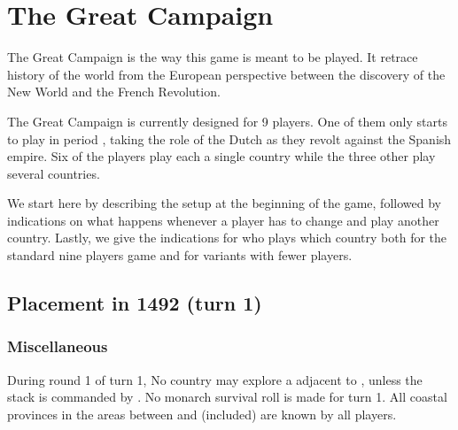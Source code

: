 

\section{The Great Campaign}
\begin{designnote}
  The Great Campaign is the way this game is meant to be played. It retrace
  history of the world from the European perspective between the discovery of
  the New World and the French Revolution.

  The Great Campaign is currently designed for 9 players. One of them only
  starts to play in period , taking the role of the Dutch as they
  revolt against the Spanish empire. Six of the players play each a single
  country while the three other play several countries.

  We start here by describing the setup at the beginning of the game, followed
  by indications on what happens whenever a player has to change and play
  another country. Lastly, we give the indications for who plays which country
  both for the standard nine players game and for variants with fewer
  players.
\end{designnote}




\subsection{Placement in 1492 (turn 1)}


\subsubsection{Miscellaneous}
\aparag During round 1 of turn 1, No country may explore a \STZ adjacent to
\continentAmerica, unless the stack is commanded by \leaderColon.
\aparag No monarch survival roll is made for turn 1.
 All coastal provinces in the areas between
\granderegionBalouchistan and \granderegionNankin (included) are known by all
players.

